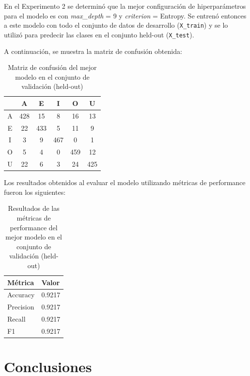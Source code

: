 \documentclass[11pt,a4paper, twocolumn]{article}
\begin{document}
\begin{itemize}
En el Experimento 2 se determinó que la mejor configuración de hiperparámetros para el modelo es con \textit{max\_depth} = 9 y \textit{criterion} = Entropy. 
Se entrenó entonces a este modelo con todo el conjunto de datos de desarrollo (\texttt{X\_train}) y se lo utilizó para predecir las clases en el conjunto held-out (\texttt{X\_test}). 

A continuación, se muestra la matriz de confusión obtenida:

\begin{table}[H]
    \centering
    \begin{tabular}{c|ccccc}
        & A & E & I & O & U \\
        \hline
        A & 428 & 15 & 8  & 16 & 13 \\
        E & 22  & 433 & 5  & 11 & 9  \\
        I & 3   & 9   & 467 & 0  & 1  \\
        O & 5   & 4   & 0   & 459 & 12 \\
        U & 22  & 6   & 3   & 24 & 425 \\
    \end{tabular}
    \caption{Matriz de confusión del mejor modelo en el conjunto de validación (held-out)}
    \label{tab:matriz_confusion}
\end{table}

Los resultados obtenidos al evaluar el modelo utilizando métricas de performance fueron los siguientes:

\begin{table}[H]
    \centering
    \begin{tabular}{ll}
        \hline
        Métrica    & Valor  \\
        \hline
        Accuracy  & 0.9217 \\
        Precision & 0.9217 \\
        Recall    & 0.9217 \\
        F1        & 0.9217 \\
        \hline
    \end{tabular}
    \caption{Resultados de las métricas de performance del mejor modelo en el conjunto de validación (held-out)}
    \label{tab:resultados}
\end{table}

\end{itemize}


\section{Conclusiones}
\end{document}
